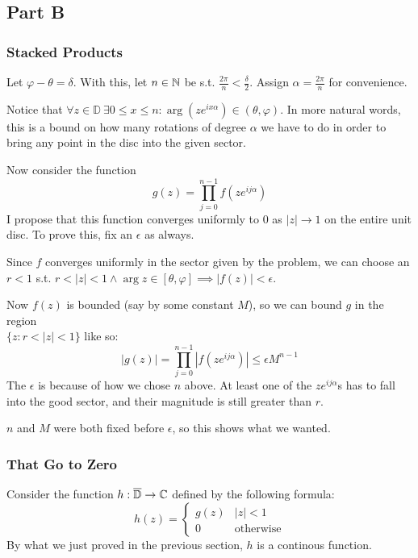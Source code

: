 \documentclass[12pt]{article}
\begin{document}
\subsection{Part B}

\subsubsection{Stacked Products}

Let $\varphi - \theta = \delta$.
With this, let $n \in \mathbb{N}$ be s.t. $\frac{2\pi}{n} < \frac{\delta}{2}$.
Assign $\alpha=\frac{2\pi}{n}$ for convenience.

Notice that $\forall z \in \mathbb{D}\ \exists 0 \le x \le n: \arg\left(ze^{ix\alpha}\right) \in (\theta, \varphi)$.
In more natural words, this is a bound on how many rotations of degree $\alpha$ we
have to do in order to bring any point in the disc into the given sector.

Now consider the function
\[g(z)=\prod_{j=0}^{n-1} f\left(ze^{ij\alpha}\right)\]
I propose that this function converges uniformly to $0$ as $|z| \to 1$ on the entire unit disc.
To prove this, fix an $\epsilon$ as always.

Since $f$ converges uniformly in the sector given by the problem, we can choose an $r < 1$ s.t.
$r < |z| < 1 \land \arg z \in [\theta, \varphi] \implies |f(z)| < \epsilon$.

Now $f(z)$ is bounded (say by some constant $M$),
so we can bound $g$ in the region \\ $\{z: r < |z| < 1\}$ like so:
\[|g(z)| = \prod_{j=0}^{n-1} \left|f\left(ze^{ij\alpha}\right)\right| \le \epsilon M^{n-1}\]
The $\epsilon$ is because of how we chose $n$ above.
At least one of the $ze^{ij\alpha}$s has to fall into the good sector,
and their magnitude is still greater than $r$.

$n$ and $M$ were both fixed before $\epsilon$, so this shows what we wanted.

\subsubsection{That Go to Zero}

Consider the function $h: \overline{\mathbb{D}} \to \mathbb{C}$ defined by the following formula:
\[h(z)=\begin{cases}
  g(z) & |z| < 1 \\
  0 & \text{otherwise}
\end{cases}\]
By what we just proved in the previous section, $h$ is a continous function.
\end{document}
